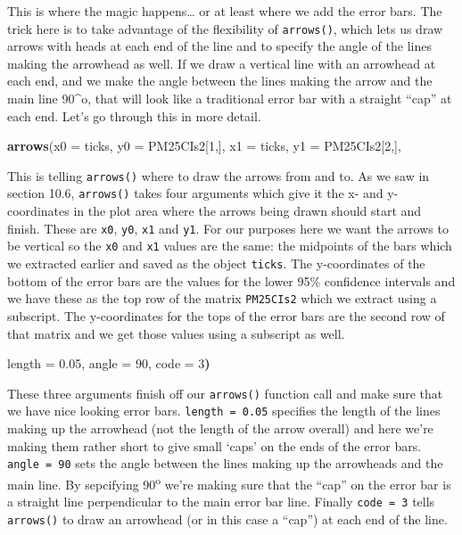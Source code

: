 \documentclass[
]{book}
\newenvironment{Shaded}{\begin{snugshade}}{\end{snugshade}}
\newcommand{\DataTypeTok}[1]{\textcolor[rgb]{0.13,0.29,0.53}{#1}}
\newcommand{\DecValTok}[1]{\textcolor[rgb]{0.00,0.00,0.81}{#1}}
\newcommand{\ErrorTok}[1]{\textcolor[rgb]{0.64,0.00,0.00}{\textbf{#1}}}
\newcommand{\FloatTok}[1]{\textcolor[rgb]{0.00,0.00,0.81}{#1}}
\newcommand{\KeywordTok}[1]{\textcolor[rgb]{0.13,0.29,0.53}{\textbf{#1}}}
\newcommand{\NormalTok}[1]{#1}
\newcommand{\StringTok}[1]{\textcolor[rgb]{0.31,0.60,0.02}{#1}}
\begin{document}
This is where the magic happens\ldots{} or at least where we add the error bars. The trick here is to take advantage of the flexibility of \texttt{arrows()}, which lets us draw arrows with heads at each end of the line and to specify the angle of the lines making the arrowhead as well. If we draw a vertical line with an arrowhead at each end, and we make the angle between the lines making the arrow and the main line 90\^{}o, that will look like a traditional error bar with a straight ``cap'' at each end. Let's go through this in more detail.

\begin{Shaded}
\begin{Highlighting}[]
\KeywordTok{arrows}\NormalTok{(}\DataTypeTok{x0 =}\NormalTok{ ticks, }
       \DataTypeTok{y0 =}\NormalTok{ PM25CIs2[}\DecValTok{1}\NormalTok{,], }
       \DataTypeTok{x1 =}\NormalTok{ ticks, }
       \DataTypeTok{y1 =}\NormalTok{ PM25CIs2[}\DecValTok{2}\NormalTok{,],}
\end{Highlighting}
\end{Shaded}

This is telling \texttt{arrows()} where to draw the arrows from and to. As we saw in section 10.6, \texttt{arrows()} takes four arguments which give it the x- and y- coordinates in the plot area where the arrows being drawn should start and finish. These are \texttt{x0}, \texttt{y0}, \texttt{x1} and \texttt{y1}. For our purposes here we want the arrows to be vertical so the \texttt{x0} and \texttt{x1} values are the same: the midpoints of the bars which we extracted earlier and saved as the object \texttt{ticks}. The y-coordinates of the bottom of the error bars are the values for the lower 95\% confidence intervals and we have these as the top row of the matrix \texttt{PM25CIs2} which we extract using a subscript. The y-coordinates for the tops of the error bars are the second row of that matrix and we get those values using a subscript as well.

\begin{Shaded}
\begin{Highlighting}[]
\NormalTok{       length =}\StringTok{ }\FloatTok{0.05}\NormalTok{,}
\NormalTok{       angle =}\StringTok{ }\DecValTok{90}\NormalTok{,}
\NormalTok{       code =}\StringTok{ }\DecValTok{3}\ErrorTok{)}
\end{Highlighting}
\end{Shaded}

These three arguments finish off our \texttt{arrows()} function call and make sure that we have nice looking error bars. \texttt{length\ =\ 0.05} specifies the length of the lines making up the arrowhead (not the length of the arrow overall) and here we're making them rather short to give small `caps' on the ends of the error bars. \texttt{angle\ =\ 90} sets the angle between the lines making up the arrowheads and the main line. By sepcifying 90\textsuperscript{o} we're making sure that the ``cap'' on the error bar is a straight line perpendicular to the main error bar line. Finally \texttt{code\ =\ 3} tells \texttt{arrows()} to draw an arrowhead (or in this case a ``cap'') at each end of the line.
\end{document}
